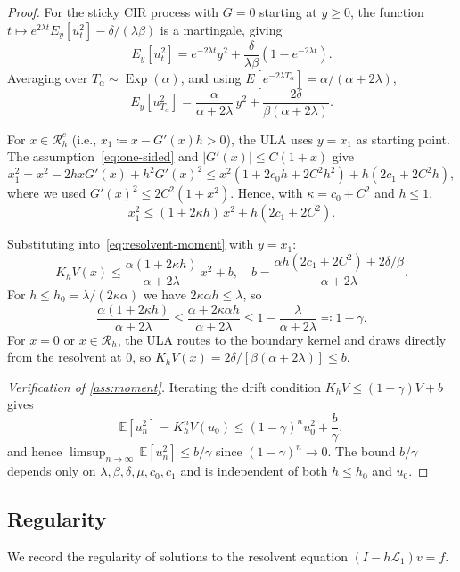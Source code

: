 \documentclass[aap,preprint]{imsart}
\numberwithin{equation}{section}
\theoremstyle{plain}
\theoremstyle{definition}
\begin{document}
\begin{proof}
  For the sticky CIR process with $G=0$ starting at $y\ge 0$, the function
  $t\mapsto e^{2\lambda t}E_y[u_t^2]-\delta/(\lambda\beta)$ is a martingale, giving
  \[
    E_y[u_t^2]  =  e^{-2\lambda t}y^2 + \frac{\delta}{\lambda\beta}(1-e^{-2\lambda t}).
  \]
  Averaging over $T_\alpha\sim\operatorname{Exp}(\alpha)$, and using
  $E[e^{-2\lambda T_\alpha}]=\alpha/(\alpha+2\lambda)$,
  \begin{equation}\label{eq:resolvent-moment}
    E_y[u_{T_\alpha}^2]
     = \frac{\alpha}{\alpha+2\lambda}\,y^2
      +\frac{2\delta}{\beta(\alpha+2\lambda)}.
  \end{equation}

  For $x \in \mathcal{R}_h^c$ (i.e., $x_1 \coloneqq x - G'(x)h > 0$), the ULA uses $y = x_1$ as starting point.
  The assumption~\cref{eq:one-sided} and $|G'(x)|\le C(1+x)$ give
  \[
    x_1^2 = x^2 - 2hxG'(x) + h^2 G'(x)^2
     \le  x^2(1+2c_0 h+2C^2 h^2) + h(2c_1+2C^2 h),
  \]
  where we used $G'(x)^2\le 2C^2(1+x^2)$.  Hence, with
  $\kappa=c_0+C^2$ and $h\le 1$,
  \[
    x_1^2  \le  (1+2\kappa h)\,x^2 + h(2c_1+2C^2).
  \]

  Substituting into~\cref{eq:resolvent-moment} with $y=x_1$:
  \[
    K_h V(x)
     \le \frac{\alpha(1+2\kappa h)}{\alpha+2\lambda}\,x^2 + b,
    \quad
    b = \frac{\alpha h(2c_1+2C^2)+2\delta/\beta}{\alpha+2\lambda}.
  \]
  For $h\le h_0=\lambda/(2\kappa\alpha)$ we have $2\kappa\alpha h\le\lambda$, so
  \[
    \frac{\alpha(1+2\kappa h)}{\alpha+2\lambda}
     \le \frac{\alpha+2\kappa\alpha h}{\alpha+2\lambda}
     \le 1-\frac{\lambda}{\alpha+2\lambda}
     \eqqcolon 1-\gamma.
  \]
  For $x=0$ or $x \in \mathcal{R}_h$, the ULA routes to the boundary kernel and draws directly from the resolvent at $0$, so
  $K_h V(x)=2\delta/[\beta(\alpha+2\lambda)]\le b$.

  \textit{Verification of \cref{ass:moment}.}
  Iterating the drift condition $K_h V \le (1-\gamma)V + b$ gives
  \[
    \mathbb{E}[u_n^2]
    = K_h^n V(u_0)
    \le (1-\gamma)^n u_0^2 + \frac{b}{\gamma},
  \]
  and hence $\limsup_{n\to\infty}\,\mathbb{E}[u_n^2] \le b/\gamma$
  since $(1-\gamma)^n\to 0$.  The bound $b/\gamma$ depends only on
  $\lambda,\beta,\delta,\mu,c_0,c_1$ and is independent of both $h\le h_0$
  and $u_0$.
\end{proof}



%
\subsection{Regularity} We record the regularity of solutions to the resolvent equation $(I - h\mathcal{L}_1)v = f$.
\end{document}

